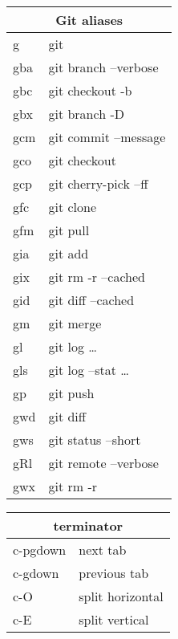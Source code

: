 \documentclass[12pt,paper=landscape,paper=a4]{scrartcl}
\begin{document}
\pagestyle{empty}
\pagecolor{gruvbox_bg} %
\color{gruvbox_fg}

\begin{multicols}{3}

    \begin{tabular}{ll}
        \multicolumn{2}{c}{Git aliases} \\
        \hline
        g    & git\\
        gba  & git branch --verbose\\
        gbc  & git checkout -b\\
        gbx  & git branch -D\\
        gcm  & git commit --message\\
        gco  & git checkout\\
        gcp  & git cherry-pick --ff\\
        gfc  & git clone\\
        gfm  & git pull\\
        gia  & git add\\
        gix  & git rm -r --cached\\
        gid  & git diff --cached\\
        gm   & git merge\\
        gl   & git log \ldots\\
        gls  & git log --stat \ldots\\
        gp   & git push\\
        gwd  & git diff\\
        gws  & git status --short\\
        gRl  & git remote --verbose\\
        gwx  & git rm -r
    \end{tabular}

    \vspace{1em}

    \begin{tabular}{ll}
        \multicolumn{2}{c}{terminator}\\
        \hline
        c-pgdown & next tab\\
        c-gdown & previous tab\\
        c-O & split horizontal\\
        c-E & split vertical
    \end{tabular}


\end{multicols}
\end{document}
